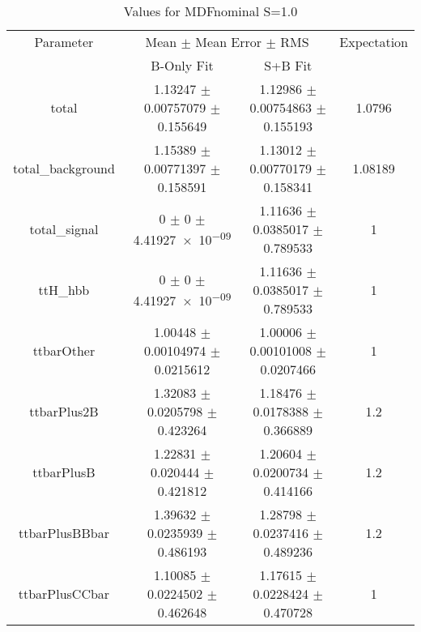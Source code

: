 \begin{table}
\centering
\caption{Values for MDFnominal S=1.0}
\begin{tabular}{cccc}
\toprule
Parameter & \multicolumn{2}{c}{Mean $\pm$ Mean Error $\pm$ RMS} & Expectation\\
 & B-Only Fit & S+B Fit & \\
\midrule
total & \num{1.13247} $\pm$ \num{0.00757079} $\pm$ \num{0.155649} & \num{1.12986} $\pm$ \num{0.00754863} $\pm$ \num{0.155193} & \num{1.0796}\\
total\_background & \num{1.15389} $\pm$ \num{0.00771397} $\pm$ \num{0.158591} & \num{1.13012} $\pm$ \num{0.00770179} $\pm$ \num{0.158341} & \num{1.08189}\\
total\_signal & \num{0} $\pm$ \num{0} $\pm$ \num{4.41927e-09} & \num{1.11636} $\pm$ \num{0.0385017} $\pm$ \num{0.789533} & \num{1}\\
ttH\_hbb & \num{0} $\pm$ \num{0} $\pm$ \num{4.41927e-09} & \num{1.11636} $\pm$ \num{0.0385017} $\pm$ \num{0.789533} & \num{1}\\
ttbarOther & \num{1.00448} $\pm$ \num{0.00104974} $\pm$ \num{0.0215612} & \num{1.00006} $\pm$ \num{0.00101008} $\pm$ \num{0.0207466} & \num{1}\\
ttbarPlus2B & \num{1.32083} $\pm$ \num{0.0205798} $\pm$ \num{0.423264} & \num{1.18476} $\pm$ \num{0.0178388} $\pm$ \num{0.366889} & \num{1.2}\\
ttbarPlusB & \num{1.22831} $\pm$ \num{0.020444} $\pm$ \num{0.421812} & \num{1.20604} $\pm$ \num{0.0200734} $\pm$ \num{0.414166} & \num{1.2}\\
ttbarPlusBBbar & \num{1.39632} $\pm$ \num{0.0235939} $\pm$ \num{0.486193} & \num{1.28798} $\pm$ \num{0.0237416} $\pm$ \num{0.489236} & \num{1.2}\\
ttbarPlusCCbar & \num{1.10085} $\pm$ \num{0.0224502} $\pm$ \num{0.462648} & \num{1.17615} $\pm$ \num{0.0228424} $\pm$ \num{0.470728} & \num{1}\\
\bottomrule
\end{tabular}
\end{table}